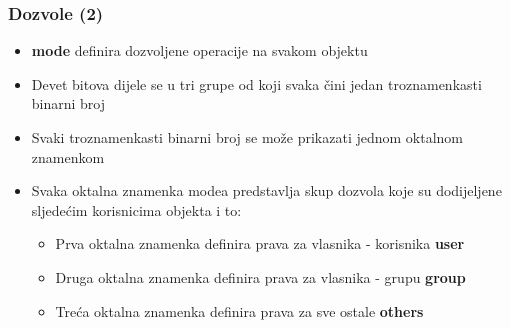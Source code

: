 \documentclass[table,usenames,dvipsnames] {beamer}
\begin{document}
\begin{frame}[t]
\frametitle{Dozvole (2)}
\begin{itemize}
  \item \textbf{mode} definira dozvoljene operacije na svakom objektu
  \vspace{1em}
  \item Devet bitova dijele se u tri grupe od koji svaka čini jedan troznamenkasti binarni broj
  \item Svaki troznamenkasti binarni broj se može prikazati jednom oktalnom znamenkom
\end{itemize}
\begin{itemize}
  \item Svaka oktalna znamenka modea predstavlja skup dozvola koje su dodijeljene sljedećim korisnicima objekta i to:
  \begin{itemize}
  \item Prva oktalna znamenka definira prava za vlasnika - korisnika \hfill \textbf{user}
    \item Druga oktalna znamenka definira prava za vlasnika - grupu \hfill \textbf{group}
    \item Treća oktalna znamenka definira prava za sve ostale \hfill \textbf{others}
  \end{itemize}
\end{itemize}
\end{frame}
\end{document}
